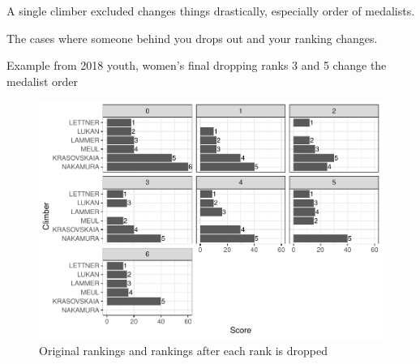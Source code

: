 \documentclass[12pt]{article}
\begin{document}
A single climber excluded changes things drastically, especially order
of medalists.

The cases where someone behind you drops out and your ranking changes.

Example from 2018 youth, women's final dropping ranks 3 and 5 change the
medalist order

\begin{figure}
\centering
\includegraphics{draft_files/figure-latex/unnamed-chunk-11-1.pdf}
\caption{Original rankings and rankings after each rank is dropped}
\end{figure}



\end{document}
